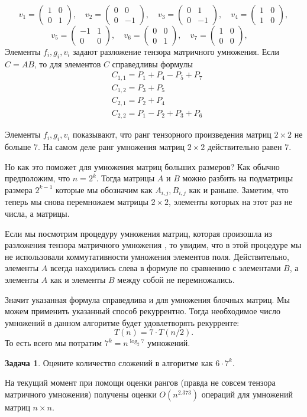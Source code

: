 \documentclass[12pt,a4paper,oneside]{book}
\theoremstyle{definition}
\newtheorem{zad}{\color{violet!100!black}Задача}
\def\zd{\begin{zad}}
\def\ezd{\end{zad}}
\def\pmat{\begin{pmatrix}}
\def\epmat{\end{pmatrix}}
\begin{document}
$$
v_1= \pmat 1 & 0 \\ 0 & 1 \epmat,  \quad
v_2=\pmat 0& 0\\0 & -1\epmat,  \quad
v_3=\pmat 0 & 1 \\ 0 & -1 \epmat,  \quad
v_4=\pmat 1& 0\\1 & 0 \epmat,  
$$
$$
v_5=\pmat -1& 1\\ 0& 0\epmat,  \quad
v_6=\pmat 0&0 \\0 & 1\epmat,  \quad
v_7=\pmat 1& 0\\ 0& 0\epmat,  \quad
$$
Элементы $f_i,g_i,v_i$ задают разложение тензора матричного умножения. Если $C=AB$, то для элементов $C$ справедливы формулы
$$ 
\begin{aligned}
&C_{1,1}=P_1+P_4-P_5+P_7\\
&C_{1,2}=P_3+P_5\\
&C_{2,1}=P_2+P_4\\
&C_{2,2}=P_1-P_2+P_3+P_6
\end{aligned}
$$

Элементы $f_i,g_i,v_i$ показывают, что ранг тензорного произведения матриц $2\times 2$ не больше $7$. На самом деле ранг умножения матриц $2\times 2$ действительно равен $7$.

Но как это поможет для умножения матриц больших размеров? Как обычно предположим, что $n=2^k$. Тогда матрицы $A$ и $B$ можно разбить на подматрицы размера $2^{k-1}$ которые мы обозначим как $A_{i,j}, B_{i,j}$ как и раньше. Заметим, что теперь мы снова перемножаем матрицы $2\times 2$, элементы которых на этот раз не числа, а матрицы. 

Если мы посмотрим процедуру умножения матриц, которая произошла из разложения тензора матричного умножения , то увидим, что в этой процедуре мы не использовали коммутативности умножения элементов поля. Действительно, элементы $A$ всегда находились слева в формуле по сравнению с элементами $B$, а элементы $A$ как и элементы $B$ между собой не перемножались.

Значит указанная формула справедлива и для умножения блочных матриц. Мы можем применить указанный способ рекуррентно. Тогда необходимое  число умножений в данном алгоритме будет удовлетворять рекурренте:
$$T(n)=7\cdot T(n/2).$$
То есть всего мы потратим $7^{k}=n^{\log_2 7}$ умножений.

\zd Оцените количество сложений в алгоритме как $6\cdot 7^k$.
\ezd

На текущий момент при помощи оценки рангов (правда не совсем тензора матричного умножения) получены оценки $O(n^{2.373})$ операций для умножений матриц $n\times n$.
\end{document}

